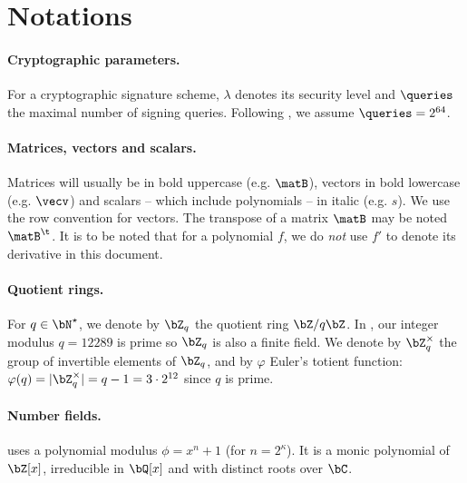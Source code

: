 \section{Notations}\label{sec:spec:notations}

\paragraph{Cryptographic parameters.} For a cryptographic signature scheme, $\lambda$ denotes its security level and $\queries$ the maximal number of signing queries. Following \cite{NIST}, we assume $\queries = 2^{64}$.

\paragraph{Matrices, vectors and scalars.} Matrices will usually be in bold uppercase (e.g. $\matB$), vectors in bold lowercase (e.g. $\vecv$) and scalars -- which include polynomials -- in italic (e.g. $s$). We use the row convention for vectors. The transpose of a matrix $\matB$ may be noted $\matB^\t$. It is to be noted that for a polynomial $f$, we do \emph{not} use $f'$ to denote its derivative in this document.

\paragraph{Quotient rings.} For $q \in \bN^\star$, we denote by $\bZ_q$ the quotient ring $\bZ/q\bZ$. In \falcon, our integer modulus $q = 12289$ is prime so $\bZ_q$ is also a finite field. We denote by $\bZ_q^\times$ the group of invertible elements of $\bZ_q$, and by $\varphi$ Euler's totient function: $\varphi(q) = |\bZ_q^\times| = q - 1 = 3 \cdot 2^{12}$ since $q$ is prime.

\paragraph{Number fields.} \falcon uses a polynomial modulus $\phi = x^n+1$ (for $n = 2^\kappa$). It is a monic polynomial of $\bZ[x]$, irreducible in $\bQ[x]$ and with distinct roots over $\bC$.

